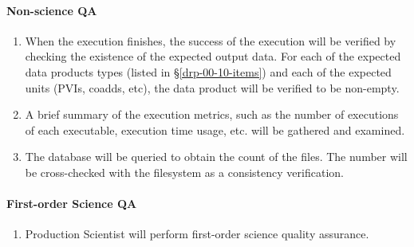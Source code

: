 \paragraph{Non-science QA}
\begin{enumerate}
  \item{When the execution finishes, the success of the execution will be verified by checking the existence of the expected output data.
  For each of the expected data products types (listed in \S\ref{drp-00-10-items})
  and each of the expected units (PVIs, coadds, etc), the data product will be
  verified to be non-empty.}
  \item{A brief summary of the execution metrics, such as the number of executions of each executable, execution time usage, etc. will be gathered and examined.}
  \item{The database will be queried to obtain the count of the files. The number will be cross-checked with the filesystem as a consistency verification.}
\end{enumerate}
\paragraph{First-order Science QA}
\begin{enumerate}
  \item{Production Scientist will perform first-order science quality assurance.}
\end{enumerate}
